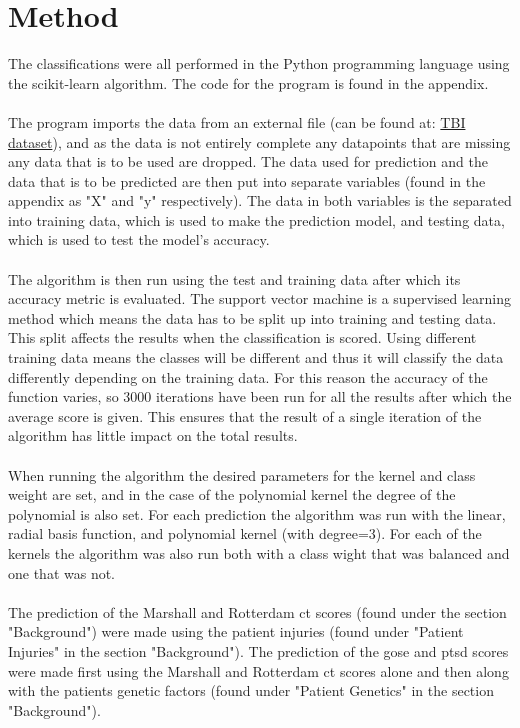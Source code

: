 \documentclass[11pt]{article}
\begin{document}
\section{Method}
The classifications were all performed in the Python programming language using the scikit-learn algorithm. The code for the program is found in the appendix.\\
\\
The program imports the data from an external file (can be found at: \href{https://data.world/deviramanan2016/traumatic-brain-injury}{TBI dataset})\cite{TraumaticBrainInjurya}, and as the data is not entirely complete any datapoints that are missing any data that is to be used are dropped. The data used for prediction and the data that is to be predicted are then put into separate variables (found in the appendix as "X" and "y" respectively). The data in both variables is the separated into training data, which is used to make the prediction model, and testing data, which is used to test the model's accuracy.\\
\\
The algorithm is then run using the test and training data after which its accuracy metric is evaluated. The support vector machine is a supervised learning method which means the data has to be split up into training and testing data. This split affects the results when the classification is scored. Using different training data means the classes will be different and thus it will classify the data differently depending on the training data. For this reason the accuracy of the function varies, so 3000 iterations have been run for all the results after which the average score is given. This ensures that the result of a single iteration of the algorithm has little impact on the total results.\\
\\
When running the algorithm the desired parameters for the kernel and class weight are set, and in the case of the polynomial kernel the degree of the polynomial is also set. For each prediction the algorithm was run with the linear, radial basis function, and polynomial kernel (with degree=3). For each of the kernels the algorithm was also run both with a class wight that was balanced and one that was not.\\
\\
The prediction of the Marshall and Rotterdam \gls{ct} scores (found under the section "Background") were made using the patient injuries (found under "Patient Injuries" in the section "Background"). The prediction of the \gls{gose} and \gls{ptsd} scores were made first using the Marshall and Rotterdam \gls{ct} scores alone and then along with the patients genetic factors (found under "Patient Genetics" in the section "Background").
\end{document}
